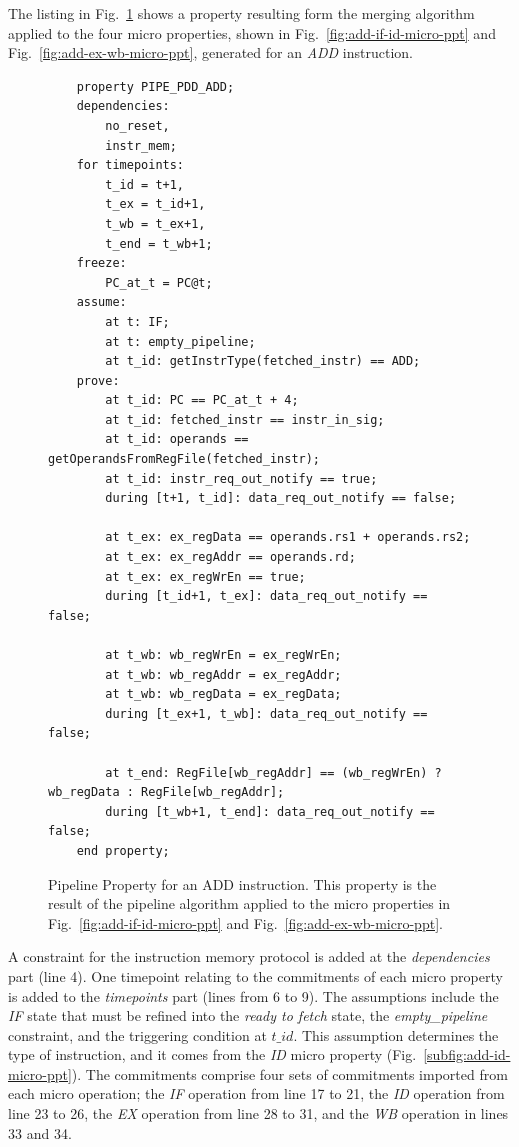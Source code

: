 The listing in Fig.~\ref{fig:add-ptt-merg-algorithm} shows a property resulting form the merging algorithm applied to the four micro properties, shown in Fig.~\ref{fig:add-if-id-micro-ppt} and Fig.~\ref{fig:add-ex-wb-micro-ppt}, generated for an \textit{ADD} instruction.

\begin{figure}[htb!]
    \begin{lstlisting}
    property PIPE_PDD_ADD;
    dependencies: 
        no_reset,
        instr_mem;
    for timepoints:
        t_id = t+1,
        t_ex = t_id+1,
        t_wb = t_ex+1,
        t_end = t_wb+1;
    freeze:
        PC_at_t = PC@t;
    assume:
        at t: IF;
        at t: empty_pipeline;
        at t_id: getInstrType(fetched_instr) == ADD;
    prove:
        at t_id: PC == PC_at_t + 4;
        at t_id: fetched_instr == instr_in_sig;
        at t_id: operands == getOperandsFromRegFile(fetched_instr);
        at t_id: instr_req_out_notify == true;
        during [t+1, t_id]: data_req_out_notify == false;
    
        at t_ex: ex_regData == operands.rs1 + operands.rs2;
        at t_ex: ex_regAddr == operands.rd;
        at t_ex: ex_regWrEn == true;
        during [t_id+1, t_ex]: data_req_out_notify == false;
    
        at t_wb: wb_regWrEn = ex_regWrEn;
        at t_wb: wb_regAddr = ex_regAddr;
        at t_wb: wb_regData = ex_regData;
        during [t_ex+1, t_wb]: data_req_out_notify == false;
    
        at t_end: RegFile[wb_regAddr] == (wb_regWrEn) ? wb_regData : RegFile[wb_regAddr];
        during [t_wb+1, t_end]: data_req_out_notify == false;
    end property;\end{lstlisting}
    \caption{Pipeline Property for an ADD instruction. This property is the result of the pipeline algorithm applied to the micro properties in Fig.~\ref{fig:add-if-id-micro-ppt} and Fig.~\ref{fig:add-ex-wb-micro-ppt}.}
    \label{fig:add-ptt-merg-algorithm}
\end{figure}

A constraint for the instruction memory protocol is added at the \textit{dependencies} part (line 4). One timepoint relating to the commitments of each micro property is added to the \textit{timepoints} part (lines from 6 to 9). The assumptions include the \textit{IF} state that must be refined into the \textit{ready to fetch} state, the \textit{empty\_pipeline} constraint, and the triggering condition at $t\_id$. This assumption determines the type of instruction, and it comes from the \textit{ID} micro property (Fig.~\ref{subfig:add-id-micro-ppt}). The commitments comprise four sets of commitments imported from each micro operation; the \textit{IF} operation from line 17 to 21, the \textit{ID} operation from line 23 to 26, the \textit{EX} operation from line 28 to 31, and the \textit{WB} operation in lines 33 and 34.

